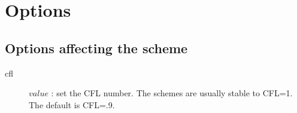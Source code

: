 \documentclass[11pt]{article}
\begin{document}

% 




\section{Options} \label{sec:option}

\subsection{Options affecting the scheme}

\begin{description}
  \item [\qquad cfl] $value$ : set the CFL number. The schemes are usually stable to CFL=1. The default is CFL=.9.
\end{description}
\end{document}
